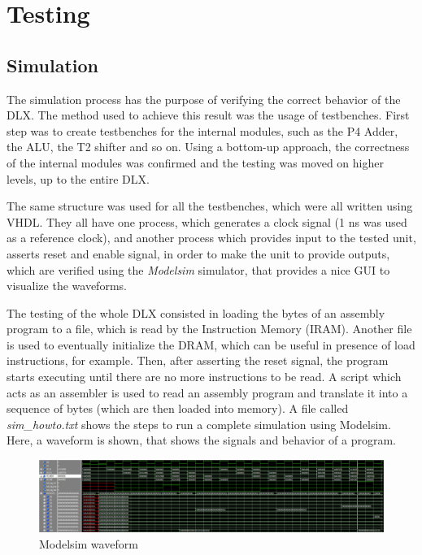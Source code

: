 \chapter{Testing}
\label{Simulation}

\section{Simulation}

The simulation process has the purpose of verifying the correct behavior of the DLX.
The method used to achieve this result was the usage of testbenches.
First step was to create testbenches for the internal modules, such as the P4 Adder, the ALU, the T2 shifter and so on.
Using a bottom-up approach, the correctness of the internal modules was confirmed and the testing was moved on higher levels, up to the entire DLX.

The same structure was used for all the testbenches, which were all written using VHDL.
They all have one process, which generates a clock signal (1 ns was used as a reference clock), and another process which
provides input to the tested unit, asserts reset and enable signal, in order to make the unit to provide outputs, which are verified using the \textit{Modelsim} simulator, that provides
a nice GUI to visualize the waveforms.

The testing of the whole DLX consisted in loading the bytes of an assembly program to a file, which is read by the Instruction Memory (IRAM).
Another file is used to eventually initialize the DRAM, which can be useful in presence of load instructions, for example.
Then, after asserting the reset signal, the program starts executing until there are no more instructions to be read.
A script which acts as an assembler is used to read an assembly program and translate it into a sequence of bytes (which are then loaded into memory).
A file called \textit{sim\_howto.txt} shows the steps to run a complete simulation using Modelsim.
Here, a waveform is shown, that shows the signals and behavior of a program.

\begin{figure}[h!]
	\centering
	\includegraphics[width=\textwidth]{chapters/figures/waveform.png} 
	\caption{Modelsim waveform}
	\label{fig:wave}  %
	\end{figure}





